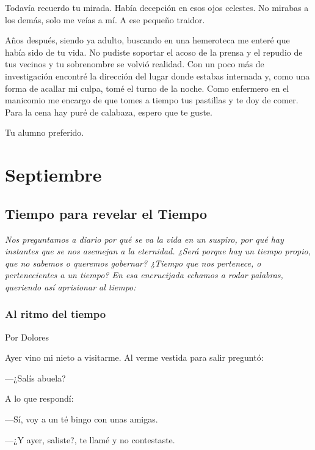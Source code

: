 \documentclass[11pt,twoside,openright,a5paper]{book}
\begin{document}
Todavía recuerdo tu mirada. Había decepción en esos ojos celestes. No mirabas a los demás, solo me veías a mí. A ese pequeño traidor.

Años después, siendo ya adulto, buscando en una hemeroteca me enteré que había sido de tu vida. No pudiste soportar el acoso de la prensa y el repudio de tus vecinos y tu sobrenombre se volvió realidad. Con un poco más de investigación encontré la dirección del lugar donde estabas internada y, como una forma de acallar mi culpa, tomé el turno de la noche. Como enfermero en el manicomio me encargo de que tomes a tiempo tus pastillas y te doy de comer. Para la cena hay puré de calabaza, espero que te guste.

Tu alumno preferido.

\part*{Septiembre}

\chapter*{Tiempo para revelar el Tiempo}

\vspace{0.5cm}
\emph{Nos preguntamos a diario por qué se va la vida en un suspiro, por qué hay instantes que se nos asemejan a la eternidad. ¿Será porque hay un tiempo propio, que no sabemos o queremos gobernar? ¿Tiempo que nos pertenece, o pertenecientes a un tiempo? En esa encrucijada echamos a rodar palabras, queriendo así aprisionar al tiempo:}

\section*{Al ritmo del tiempo}

                                                                                    \begin{flushright}Por Dolores\end{flushright}

Ayer vino mi nieto a visitarme. Al verme vestida para salir preguntó:

---¿Salís abuela?

A lo que respondí: 

---Sí, voy a un té bingo con unas amigas.

---¿Y ayer, saliste?, te llamé y no contestaste.
\end{document}
